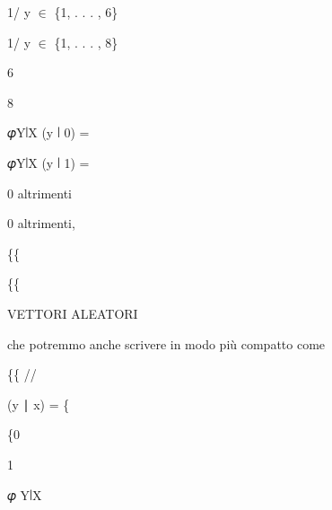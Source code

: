 \documentclass[a4paper,portrait,12pt]{article}
\begin{document}
\begin{flushleft}
1/ y $\in$ \{1, . . . , 6\}
\end{flushleft}


\begin{flushleft}
1/ y $\in$ \{1, . . . , 8\}
\end{flushleft}


6


8


\begin{flushleft}
𝜑Y∣X (y ∣ 0) =
\end{flushleft}


\begin{flushleft}
𝜑Y∣X (y ∣ 1) =
\end{flushleft}


\begin{flushleft}
0 altrimenti
\end{flushleft}


\begin{flushleft}
0 altrimenti,
\end{flushleft}





\{\{





\{\{










\begin{flushleft}
VETTORI ALEATORI
\end{flushleft}





\begin{flushleft}
che potremmo anche scrivere in modo più compatto come
\end{flushleft}





\{\{ //


\begin{flushleft}
(y ∣ x) = \{
\end{flushleft}


\{0


1





\begin{flushleft}
𝜑 Y∣X
\end{flushleft}
\end{document}
